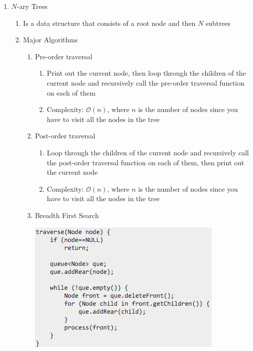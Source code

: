 \documentclass [12pt, executivepaper]{article}
\begin{document}
\begin{enumerate}
\begin{enumerate}
\end{enumerate}

\pagebreak

\vspace*{-40mm}

\item $N$-ary Trees

\begin{enumerate}

\item Is a data structure that consists of a root node and then $N$ subtrees

\item Major Algorithms

\begin{enumerate}

\item Pre-order traversal

\begin{enumerate}

\item Print out the current node, then loop through the children of the current node and recursively call the pre-order traversal function on each of them

\item Complexity: $\mathcal{O}(n)$, where $n$ is the number of nodes since you have to visit all the nodes in the tree

\end{enumerate}

\item Post-order traversal

\begin{enumerate}

\item Loop through the children of the current node and recursively call the post-order traversal function on each of them, then print out the current node

\item Complexity: $\mathcal{O}(n)$, where $n$ is the number of nodes since you have to visit all the nodes in the tree

\end{enumerate}

\item Breadth First Search

\vspace{1mm} 

\includegraphics[scale=0.5]{BreadthFirstSearchN-aryTree}


\end{enumerate}
\end{enumerate}
\end{enumerate}
\end{document}
